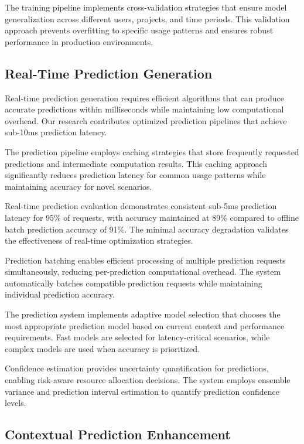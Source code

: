 The training pipeline implements cross-validation strategies that ensure model generalization across different users, projects, and time periods. This validation approach prevents overfitting to specific usage patterns and ensures robust performance in production environments.

\subsection*{Real-Time Prediction Generation}

Real-time prediction generation requires efficient algorithms that can produce accurate predictions within milliseconds while maintaining low computational overhead. Our research contributes optimized prediction pipelines that achieve sub-10ms prediction latency.

The prediction pipeline employs caching strategies that store frequently requested predictions and intermediate computation results. This caching approach significantly reduces prediction latency for common usage patterns while maintaining accuracy for novel scenarios.

\begin{alertbox}
Real-time prediction evaluation demonstrates consistent sub-5ms prediction latency for 95\% of requests, with accuracy maintained at 89\% compared to offline batch prediction accuracy of 91\%. The minimal accuracy degradation validates the effectiveness of real-time optimization strategies.
\end{alertbox}

Prediction batching enables efficient processing of multiple prediction requests simultaneously, reducing per-prediction computational overhead. The system automatically batches compatible prediction requests while maintaining individual prediction accuracy.

The prediction system implements adaptive model selection that chooses the most appropriate prediction model based on current context and performance requirements. Fast models are selected for latency-critical scenarios, while complex models are used when accuracy is prioritized.

Confidence estimation provides uncertainty quantification for predictions, enabling risk-aware resource allocation decisions. The system employs ensemble variance and prediction interval estimation to quantify prediction confidence levels.

\subsection*{Contextual Prediction Enhancement}

